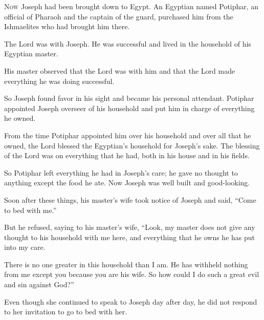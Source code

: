 \begin{scripture}
 \allowchapbreak\hypertarget{ch-genesis-39}{}\lettrine[lines=5]{\color{pentateuch}N}{\textsc{ow}} Joseph had been brought down to Egypt. An Egyptian named Potiphar, an official of Pharaoh and the captain of the guard, purchased him from the Ishmaelites who had brought him there.\everypar{}
 The Lord was with Joseph. He was successful and lived in the household of his Egyptian master.
 His master observed that the Lord was with him and that the Lord made everything he was doing successful.
 So Joseph found favor in his sight and became his personal attendant. Potiphar appointed Joseph overseer of his household and put him in charge of everything he owned.
 From the time Potiphar appointed him over his household and over all that he owned, the Lord blessed the Egyptian's household for Joseph's sake. The blessing of the Lord was on everything that he had, both in his house and in his fields.
\everypar{}

 So Potiphar left everything he had in Joseph's care; he gave no thought to anything except the food he ate. Now Joseph was well built and good-looking.
 Soon after these things, his master's wife took notice of Joseph and said, ``Come to bed with me.''
 But he refused, saying to his master's wife, ``Look, my master does not give any thought to his household with me here, and everything that he owns he has put into my care.
 There is no one greater in this household than I am. He has withheld nothing from me except you because you are his wife. So how could I do such a great evil and sin against God?''
 Even though she continued to speak to Joseph day after day, he did not respond to her invitation to go to bed with her.
\everypar{}


\end{scripture}
